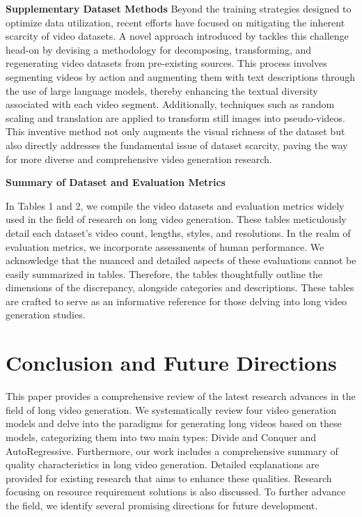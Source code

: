 \documentclass{article}
\begin{document}
\noindent\textbf{Supplementary Dataset Methods}
Beyond the training strategies designed to optimize data utilization, recent efforts have focused on mitigating the inherent scarcity of video datasets. A novel approach introduced by \cite{VidRD} tackles this challenge head-on by devising a methodology for decomposing, transforming, and regenerating video datasets from pre-existing sources. This process involves segmenting videos by action and augmenting them with text descriptions through the use of large language models, thereby enhancing the textual diversity associated with each video segment. Additionally, techniques such as random scaling and translation are applied to transform still images into pseudo-videos. This inventive method not only augments the visual richness of the dataset but also directly addresses the fundamental issue of dataset scarcity, paving the way for more diverse and comprehensive video generation research.


\noindent\textbf{Summary of Dataset and Evaluation Metrics} 

In Tables 1 and 2, we compile the video datasets and evaluation metrics widely used in the field of research on long video generation. These tables meticulously detail each dataset's video count, lengths, styles, and resolutions. In the realm of evaluation metrics, we incorporate assessments of human performance. We acknowledge that the nuanced and detailed aspects of these evaluations cannot be easily summarized in tables. Therefore, the tables thoughtfully outline the dimensions of the discrepancy, alongside categories and descriptions. These tables are crafted to serve as an informative reference for those delving into long video generation studies.
\section{Conclusion and Future Directions}
This paper provides a comprehensive review of the latest research advances in the field of long video generation. We systematically review four video generation models and delve into the paradigms for generating long videos based on these models, categorizing them into two main types: Divide and Conquer and AutoRegressive. Furthermore, our work includes a comprehensive summary of quality characteristics in long video generation. Detailed explanations are provided for existing research that aims to enhance these qualities. Research focusing on resource requirement solutions is also discussed. To further advance the field, we identify several promising directions for future development.
\end{document}

